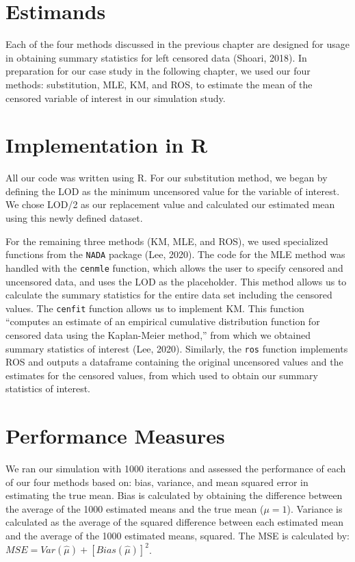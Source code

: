 \documentclass[12pt, twoside]{amherstthesis}
\begin{document}
\hypertarget{estimands}{%
\section{Estimands}\label{estimands}}

Each of the four methods discussed in the previous chapter are designed for usage in obtaining summary statistics for left censored data (Shoari, 2018). In preparation for our case study in the following chapter, we used our four methods: substitution, MLE, KM, and ROS, to estimate the mean of the censored variable of interest in our simulation study.

\hypertarget{implementation}{%
\section{Implementation in R}\label{implementation}}

All our code was written using R. For our substitution method, we began by defining the LOD as the minimum uncensored value for the variable of interest. We chose LOD/2 as our replacement value and calculated our estimated mean using this newly defined dataset.

For the remaining three methods (KM, MLE, and ROS), we used specialized functions from the \texttt{NADA} package (Lee, 2020). The code for the MLE method was handled with the \texttt{cenmle} function, which allows the user to specify censored and uncensored data, and uses the LOD as the placeholder. This method allows us to calculate the summary statistics for the entire data set including the censored values. The \texttt{cenfit} function allows us to implement KM. This function ``computes an estimate of an empirical cumulative distribution function for censored data using the Kaplan-Meier method,'' from which we obtained summary statistics of interest (Lee, 2020). Similarly, the \texttt{ros} function implements ROS and outputs a dataframe containing the original uncensored values and the estimates for the censored values, from which used to obtain our summary statistics of interest.

\hypertarget{performance_measures}{%
\section{Performance Measures}\label{performance_measures}}

We ran our simulation with 1000 iterations and assessed the performance of each of our four methods based on: bias, variance, and mean squared error in estimating the true mean. Bias is calculated by obtaining the difference between the average of the 1000 estimated means and the true mean (\(\mu = 1\)). Variance is calculated as the average of the squared difference between each estimated mean and the average of the 1000 estimated means, squared. The MSE is calculated by: \(MSE = Var(\hat{\mu})+[Bias(\hat{\mu})]^2\).
\end{document}
